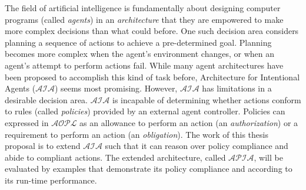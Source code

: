 The field of artificial intelligence is fundamentally about designing computer programs (called \textit{agents}) in an \textit{architecture} that they are empowered to make more complex decisions than what could before.
One such decision area considers planning a sequence of actions to achieve a pre-determined goal.
Planning becomes more complex when the agent’s environment changes, or when an agent’s attempt to perform actions fail.
While many agent architectures have been proposed to accomplish this kind of task before, Architecture for Intentional Agents ($\mathcal{AIA}$) seems most promising.
However, $\mathcal{AIA}$ has limitations in a desirable decision area.
$\mathcal{AIA}$ is incapable of determining whether actions conform to rules (called \textit{policies}) provided by an external agent controller.
Policies can expressed in $\mathcal{AOPL}$ as an allowance to perform an action (an \textit{authorization}) or a requirement to perform an action (an \textit{obligation}).
The work of this thesis proposal is to extend $\mathcal{AIA}$ such that it can reason over policy compliance and abide to compliant actions.
The extended architecture, called $\mathcal{APIA}$, will be evaluated by examples that demonstrate its policy compliance and according to its run-time performance.
